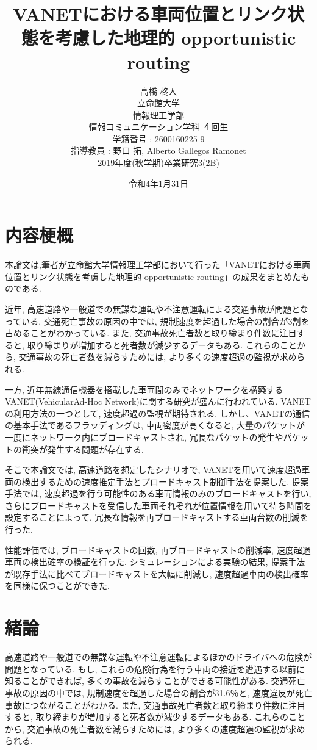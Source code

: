 \documentclass[10pt]{jreport}
\title{VANETにおける車両位置とリンク状態を考慮した地理的
opportunistic routing}
\author{%
高橋 柊人\\
立命館大学\\
情報理工学部\\
情報コミュニケーション学科 ４回生\\
学籍番号 : 2600160225-9\\
指導教員 : 野口 拓, Alberto Gallegos Ramonet\\
2019年度(秋学期)卒業研究3(2B)\\
}
\date{令和4年1月31日}
\begin{document}
\maketitle

\renewcommand{\thepage}{\roman{page}}
\setcounter{page}{1}
\chapter*{内容梗概}
本論文は,筆者が立命館大学情報理工学部において行った「VANETにおける車両位置とリンク状態を考慮した地理的
opportunistic routing」の成果をまとめたものである.

近年, 高速道路や一般道での無謀な運転や不注意運転による交通事故が問題となっている. 交通死亡事故の原因の中では, 規制速度を超過した場合の割合が3割を占めることがわかっている. また, 交通事故死亡者数と取り締まり件数に注目すると, 取り締まりが増加すると死者数が減少するデータもある. これらのことから, 交通事故の死亡者数を減らすためには, より多くの速度超過の監視が求められる.

一方, 近年無線通信機器を搭載した車両間のみでネットワークを構築するVANET(VehicularAd-Hoc Network)に関する研究が盛んに行われている. VANETの利用方法の一つとして, 速度超過の監視が期待される. しかし、VANETの通信の基本手法であるフラッディングは, 車両密度が高くなると, 大量のパケットが一度にネットワーク内にブロードキャストされ, 冗長なパケットの発生やパケットの衝突が発生する問題が存在する.

そこで本論文では, 高速道路を想定したシナリオで, VANETを用いて速度超過車両の検出するための速度推定手法とブロードキャスト制御手法を提案した. 提案手法では, 速度超過を行う可能性のある車両情報のみのブロードキャストを行い, さらにブロードキャストを受信した車両それぞれが位置情報を用いて待ち時間を設定することによって, 冗長な情報を再ブロードキャストする車両台数の削減を行った.

性能評価では, ブロードキャストの回数, 再ブロードキャストの削減率, 速度超過車両の検出確率の検証を行った. シミュレーションによる実験の結果, 提案手法が既存手法に比べてブロードキャストを大幅に削減し, 速度超過車両の検出確率を同様に保つことができた.


\newpage
\pagestyle{myheadings}
\renewcommand{\thepage}{\roman{page}}
\tableofcontents

\newpage
\renewcommand{\thepage}{\arabic{page}}
\setcounter{page}{1}
\chapter{緒論}
\vspace{-5mm}
高速道路や一般道での無謀な運転や不注意運転によるほかのドライバへの危険が問題となっている. もし, これらの危険行為を行う車両の接近を遭遇する以前に知ることができれば, 多くの事故を減らすことができる可能性がある. 交通死亡事故の原因の中では, 規制速度を超過した場合の割合が31.6％\cite{1}と, 速度違反が死亡事故につながることがわかる. また, 交通事故死亡者数と取り締まり件数に注目すると, 取り締まりが増加すると死者数が減少するデータもある. これらのことから, 交通事故の死亡者数を減らすためには, より多くの速度超過の監視が求められる. 
 
\end{document}
